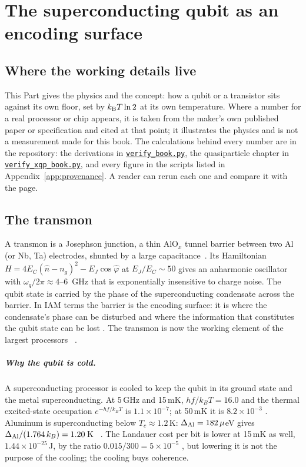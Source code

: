 \chapter{The superconducting qubit as an encoding surface}\label{ch:scprimer}


\section*{Where the working details live}
This Part gives the physics and the concept: how a qubit or a transistor sits against its own floor, set by $k_{\mathrm B} T\ln2$ at its own
temperature. Where a number for a real processor or chip appears, it is taken from the maker's own published paper or specification and
cited at that point; it illustrates the physics and is not a measurement made for this book. The calculations behind every number are in the repository:
the derivations in \href{https://github.com/hmahaffeyges/IAM-Validation/blob/main/docs/book/verify_book.py}{\texttt{verify\_book.py}}, the quasiparticle chapter in
\href{https://github.com/hmahaffeyges/IAM-Validation/blob/main/docs/verification/scripts/verify_xqp_book.py}{\texttt{verify\_xqp\_book.py}}, and every figure in the scripts listed in
Appendix~\ref{app:provenance}. A reader can rerun each one and compare it with the page.

\section{The transmon}

A transmon is a Josephson junction, a thin AlO$_x$ tunnel barrier between two Al (or Nb, Ta)
electrodes, shunted by a large capacitance~\cite{Koch2007}. Its Hamiltonian
$H=4E_C(\hat n-n_g)^2-E_J\cos\hat\varphi$ at $E_J/E_C\sim50$ gives an anharmonic oscillator
with $\omega_q/2\pi\approx4$--$6$~GHz that is exponentially insensitive to charge noise. The
qubit state is carried by the phase of the superconducting condensate across the barrier.
In IAM terms the barrier is the encoding surface: it is where the condensate's phase can be
disturbed and where the information that constitutes the qubit state can be lost \interp. The
transmon is now the working element of the largest processors~\cite{Arute2019,GoogleWillow2025,Kim2023IBM} \observed.

\paragraph{Why the qubit is cold.} A superconducting processor is cooled to keep the qubit in its ground state and the metal superconducting.
At 5\,GHz and 15\,mK, $hf/k_BT=16.0$ and the thermal excited-state occupation $e^{-hf/k_BT}$ is $1.1\times10^{-7}$; at 50\,mK it is $8.2\times10^{-3}$
\calc. Aluminum is superconducting below $T_c\approx1.2$\,K: $\Delta_{\rm Al}=182\,\mu$eV gives $\Delta_{\rm Al}/(1.764\,k_B)=1.20$\,K \calc~\cite{Blais2021}.
The Landauer cost per bit is lower at 15\,mK as well, $1.44\times10^{-25}$\,J, by the ratio $0.015/300=5\times10^{-5}$ \calc, but lowering it is
not the purpose of the cooling; the cooling buys coherence. \interp

